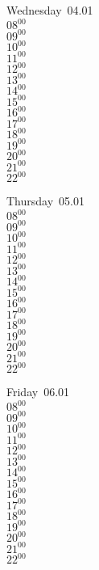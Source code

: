 \documentclass[11pt,a4paper]{book}\usepackage[]{graphicx}\usepackage[]{color}
\begin{document}
\begin{weekdaybox}
  Wednesday~04.01\\
  { 
  \vfill
  $08^{00}$\\
$09^{00}$\\
$10^{00}$\\
$11^{00}$\\
$12^{00}$\\
$13^{00}$\\
$14^{00}$\\
$15^{00}$\\
$16^{00}$\\
$17^{00}$\\
$18^{00}$\\
$19^{00}$\\
$20^{00}$\\
$21^{00}$\\
$22^{00}$\\
  }
\end{weekdaybox}
\clearpage
\begin{headerbox}
\end{headerbox}
\begin{weekdaybox}
  Thursday~05.01\\
  { 
  \vfill
  $08^{00}$\\
$09^{00}$\\
$10^{00}$\\
$11^{00}$\\
$12^{00}$\\
$13^{00}$\\
$14^{00}$\\
$15^{00}$\\
$16^{00}$\\
$17^{00}$\\
$18^{00}$\\
$19^{00}$\\
$20^{00}$\\
$21^{00}$\\
$22^{00}$\\
  }
\end{weekdaybox} 
\begin{weekdaybox}
  Friday~06.01\\
  { 
  \vfill
  $08^{00}$\\
$09^{00}$\\
$10^{00}$\\
$11^{00}$\\
$12^{00}$\\
$13^{00}$\\
$14^{00}$\\
$15^{00}$\\
$16^{00}$\\
$17^{00}$\\
$18^{00}$\\
$19^{00}$\\
$20^{00}$\\
$21^{00}$\\
$22^{00}$\\
  }
\end{weekdaybox}
\end{document}

